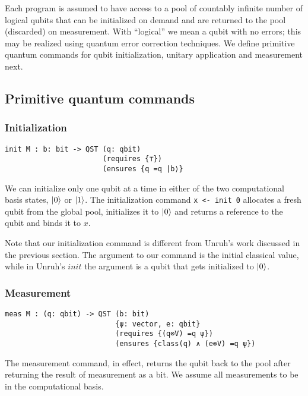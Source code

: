 \documentclass[adraft,creativecommons]{eptcs}
\theoremstyle{definition}
\theoremstyle{remark}
\begin{document}
Each program is assumed to have access to a pool of countably infinite number of logical qubits that can be initialized on demand and are returned to the pool (discarded) on measurement. With ``logical'' we mean a qubit with no errors; this may be realized using quantum error correction techniques. We define primitive quantum commands for qubit initialization, unitary application and measurement next.

\subsection{Primitive quantum commands}

\subsubsection{Initialization}
\begin{lstlisting}[language=QHaskell]
init M : b: bit -> QST (q: qbit)
                       (requires {⊤})
                       (ensures {q =q |b⟩}
\end{lstlisting}

We can initialize only one qubit at a time in either of the two computational basis states, $\ket{0}$ or $\ket{1}$. The initialization command \lstinline[language=QHaskell]{x <- init 0} allocates a fresh qubit from the global pool, initializes it to $\ket{0}$ and returns a reference to the qubit and binds it to $x$.

Note that our initialization command is different from Unruh's work discussed in the previous section. The argument to our command is the initial classical value, while in Unruh's $init$ the argument is a qubit that gets initialized to $\ket{0}$.

\subsubsection{Measurement}

\begin{lstlisting}[language=QHaskell]
meas M : (q: qbit) -> QST (b: bit)
                          {ψ: vector, e: qbit}
                          (requires {(q⊗V) =q ψ})
                          (ensures {class(q) ∧ (e⊗V) =q ψ})
\end{lstlisting}

The measurement command, in effect, returns the qubit back to the pool after returning the result of measurement as a bit. We assume all measurements to be in the computational basis.
\end{document}
